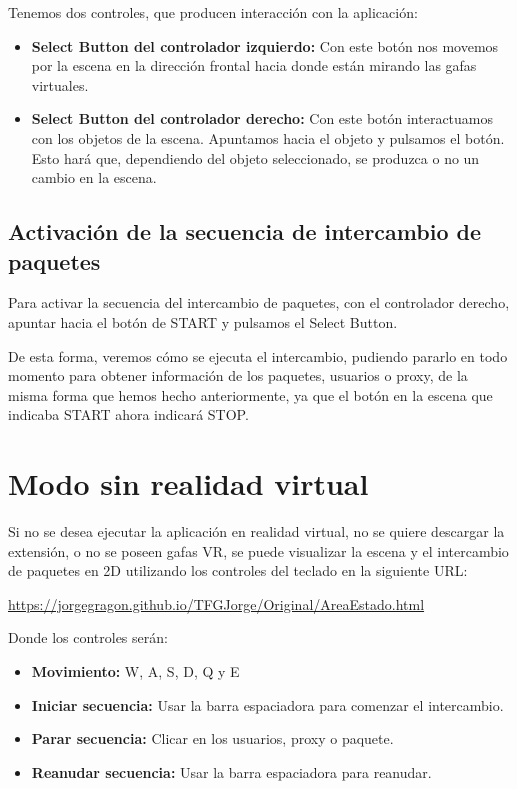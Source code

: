 \documentclass[a4paper, 12pt]{book}
\begin{document}
Tenemos dos controles, que producen interacción con la aplicación:
\begin{itemize}
  \item \textbf{Select Button del controlador izquierdo:} Con este botón nos movemos por la escena en la dirección frontal hacia donde están mirando las gafas virtuales.
  \item \textbf{Select Button del controlador derecho:} Con este botón interactuamos con los objetos de la escena. Apuntamos 
  hacia el objeto y pulsamos el botón. Esto hará que, dependiendo del 
  objeto seleccionado, se produzca o no un cambio en la escena.
\end{itemize}

\subsection{Activación de la secuencia de intercambio de paquetes}
Para activar la secuencia del intercambio de paquetes, con el controlador derecho, 
apuntar hacia el botón de START y pulsamos el Select Button.

De esta forma, veremos cómo se ejecuta el intercambio, pudiendo pararlo en todo 
momento para obtener información de los paquetes, usuarios o proxy, de la misma 
forma que hemos
hecho anteriormente, ya que el botón en la escena que indicaba START ahora 
indicará STOP.

\section{Modo sin realidad virtual}
Si no se desea ejecutar la aplicación en realidad virtual, no se quiere descargar la extensión, o no se poseen gafas VR, se puede visualizar la escena y 
el intercambio de paquetes en 2D utilizando los controles del teclado en la siguiente URL:

\url{https://jorgegragon.github.io/TFGJorge/Original/AreaEstado.html}

Donde los controles serán:

\begin{itemize}
  \item \textbf{Movimiento:} W, A, S, D, Q y E
  \item \textbf{Iniciar secuencia:} Usar la barra espaciadora para comenzar el intercambio.
  \item \textbf{Parar secuencia:} Clicar en los usuarios, proxy o paquete.
  \item \textbf{Reanudar secuencia:} Usar la barra espaciadora para reanudar.
\end{itemize}

\cleardoublepage



\end{document}
